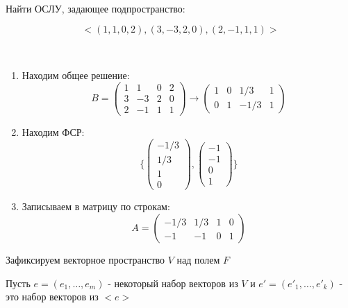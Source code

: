 \begin{problem}~
    
    Найти ОСЛУ, задающее подпространство:

    $$<\left(1, 1, 0, 2\right), \left(3, -3, 2, 0\right), \left(2, -1, 1, 1\right)>$$

    \begin{solution}~
        
        \begin{enumerate}
            \item Находим общее решение: 
            $$B = \begin{pmatrix}
                1 & 1 & 0 & 2 \\
                3 & -3 & 2 & 0 \\
                2 & -1 & 1 & 1
            \end{pmatrix} \rightarrow \begin{pmatrix}
                1 & 0 & 1/3 & 1 \\
                0 & 1 & -1/3 & 1
            \end{pmatrix}$$
            \item Находим ФСР:
            $$\{\begin{pmatrix}
                -1/3 \\ 1/3 \\ 1 \\ 0
            \end{pmatrix}, \begin{pmatrix}
                -1 \\ -1 \\ 0 \\ 1
            \end{pmatrix}\}$$
            \item Записываем в матрицу по строкам:
            $$A = \begin{pmatrix}
                -1/3 & 1/3 & 1 & 0 \\
                -1 & -1 & 0 & 1
            \end{pmatrix}$$
        \end{enumerate}

    \end{solution}

\end{problem}


\bigskip


Зафиксируем векторное пространство $V$ над полем $F$

Пусть $e = \left(e_1, \dots, e_m\right)$ - некоторый набор векторов из $V$ и $e' = \left(e'_1, \dots, e'_k\right)$ - это набор векторов из $<e>$

